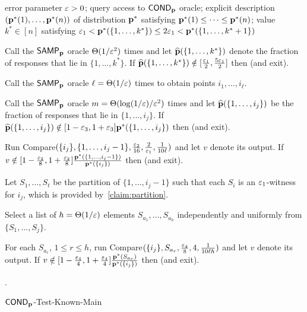 \begin{algorithm}
\begin{algorithmic}[1]
\Require error parameter $\varepsilon > 0$; query access to ${\sf COND}_{\mathbf{p}}$ oracle;
explicit description $(\mathbf{p}^\ast(1),\dots,\mathbf{p}^\ast(n))$ of distribution $\mathbf{p}^\ast$
satisfying $\mathbf{p}^\ast(1) \leq \cdots \leq \mathbf{p}^\ast(n)$;
value $k^\ast \in [n]$ satisfying
${\varepsilon_1} < \mathbf{p}^\ast(\{1,\dots,k^\ast\}) \leq 2 {\varepsilon_1} < \mathbf{p}^\ast(\{1,\dots,k^\ast+1\})$

\State Call the ${\sf SAMP}_{\mathbf{p}}$ oracle $\Theta(1/\varepsilon^2)$ times and let $\widehat{\mathbf{p}}(\{1,\dots,k^\ast\})$ denote the
fraction of responses that lie in $\{1,\dots,k^\ast\}$.  If
$\widehat{\mathbf{p}}(\{1,\dots,k^\ast\}) \notin [{\frac {{\varepsilon_1}} 2}, {\frac {5 {\varepsilon_1}} 2}]$ then \Return \reject (and exit).
\label{st:check-prefix-not-too-heavy}

\State Call the ${\sf SAMP}_{\mathbf{p}}$ oracle $\ell = \Theta(1/\varepsilon)$ times to obtain points
 $i_1,\dots,i_\ell.$
 \label{st:draw-l-samples}


\State Call the ${\sf SAMP}_{\mathbf{p}}$ oracle $m = \Theta(\log(1/\varepsilon)/\varepsilon^{2})$ times and let $\widehat{\mathbf{p}}(\{1,\dots,i_j\})$ be the
fraction of responses that lie in $\{1,\dots,i_j\}$.  If
$\widehat{\mathbf{p}}(\{1,\dots,i_j\}) \notin [1-{\varepsilon_3},1+{\varepsilon_3}]\mathbf{p}^\ast(\{1,\dots,i_j\})$ then \Return \reject
(and exit). \label{st:weigh-prefix}

 \label{eq:Dast-big}

\State Run
{\sc Compare}$(\{i_j\},\{1,\dots,i_j-1\},{\frac {{\varepsilon_2}}{16}},
{\frac{2}{{\varepsilon_1}}}, {\frac{1}{10\ell}})$ and let
$v$ denote its output.  If $v \notin [1-{\frac {{\varepsilon_2}}{8}},1+{\frac
{{\varepsilon_2}}{8}}]{\frac {\ensuremath{\mathbf{p}}^\ast(\{1,\dots,i_j-1\})}{\ensuremath{\mathbf{p}}^\ast(\{i_j\})}}$
  then \Return \reject (and exit). \label{st:lastcheck-Dast-big}

\Else

\State Let $S_1,\dots,S_t$ be the partition of $\{1,\dots,i_j-1\}$ such that
each $S_i$ is an ${\varepsilon_1}$-\good witness for $i_j$, which is provided by~\cref{claim:partition}.
\label{st:make-partition}

\State Select a list of {$h=\Theta(1/\varepsilon)$} elements $S_{a_1},\dots,S_{a_h}$ independently
and uniformly from $\{S_1,\dots,S_j\}$. \label{st:randomsets}

\State For each $S_{a_r}$, $1 \leq r \leq h$, run
{\sc Compare}$(\{i_j\},S_{a_r},\frac{\varepsilon_4}{8},4, {\frac{1}{10\ell h}})$ and let
$v$ denote its output.  If $v \notin [1-{\frac{\varepsilon_4}{4}},1+{\frac{\varepsilon_4}{4}}]{\frac {\ensuremath{\mathbf{p}}^\ast(S_{a_r})}{\ensuremath{\mathbf{p}}^\ast(\{i_j\})}}$ then \Return \reject (and exit). \label{st:lastcheck}

\EndIf
\EndFor

\State \Return \accept.

\end{algorithmic}\caption{\label{algo:cond-test-known-main}\sc
${\sf COND}_{\mathbf{p}}$-Test-Known-Main}
\end{algorithm}


